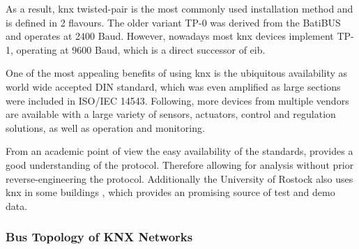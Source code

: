 As a result, \gls{knx} twisted-pair is the most commonly used installation method and is defined in 2 flavours. \parencite{DIN_EN_50090-5-2}
The older variant TP-0 was derived from the BatiBUS  and operates at 2400 Baud. However, nowadays most \gls{knx} devices implement TP-1, operating at 9600 Baud, which is a direct successor of \gls{eib}.

One of the most appealing benefits of using \gls{knx} is the ubiquitous availability as world wide accepted DIN standard, which was even amplified as large sections were included in ISO/IEC 14543.
Following, more devices from multiple vendors are available with a large variety of sensors, actuators, control and regulation solutions, as well as operation and monitoring.

From an academic point of view the easy availability of the standards, provides a good understanding of the protocol. Therefore allowing for analysis without prior reverse-engineering the protocol.
Additionally the University of Rostock also uses \gls{knx} in some buildings , which provides an promising source of test and demo data.


\subsubsection{Bus Topology of KNX Networks}
\label{sec:background:bas:knx:topo}

